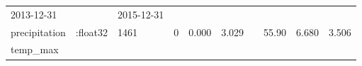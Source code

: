 \documentclass[]{article}
\begin{document}
\begin{longtable}[]{@{}llllllllll@{}}
\begin{minipage}[t]{0.07\columnwidth}
2013-12-31\strut
\end{minipage} & \begin{minipage}[t]{0.04\columnwidth}\raggedright\strut
\strut
\end{minipage} & \begin{minipage}[t]{0.07\columnwidth}\raggedright\strut
2015-12-31\strut
\end{minipage} & \begin{minipage}[t]{0.12\columnwidth}\raggedright\strut
\strut
\end{minipage} & \begin{minipage}[t]{0.05\columnwidth}\raggedright\strut
\strut
\end{minipage}\tabularnewline
\begin{minipage}[t]{0.08\columnwidth}\raggedright\strut
precipitation\strut
\end{minipage} & \begin{minipage}[t]{0.11\columnwidth}\raggedright\strut
:float32\strut
\end{minipage} & \begin{minipage}[t]{0.06\columnwidth}\raggedright\strut
1461\strut
\end{minipage} & \begin{minipage}[t]{0.07\columnwidth}\raggedright\strut
0\strut
\end{minipage} & \begin{minipage}[t]{0.07\columnwidth}\raggedright\strut
0.000\strut
\end{minipage} & \begin{minipage}[t]{0.07\columnwidth}\raggedright\strut
3.029\strut
\end{minipage} & \begin{minipage}[t]{0.04\columnwidth}\raggedright\strut
\strut
\end{minipage} & \begin{minipage}[t]{0.07\columnwidth}\raggedright\strut
55.90\strut
\end{minipage} & \begin{minipage}[t]{0.12\columnwidth}\raggedright\strut
6.680\strut
\end{minipage} & \begin{minipage}[t]{0.05\columnwidth}\raggedright\strut
3.506\strut
\end{minipage}\tabularnewline
\begin{minipage}[t]{0.08\columnwidth}\raggedright\strut
temp\_max\strut
\end{minipage} & \begin{minipage}[t]{0.11\columnwidth}\raggedright\strut

\end{minipage}
\end{longtable}
\end{document}
